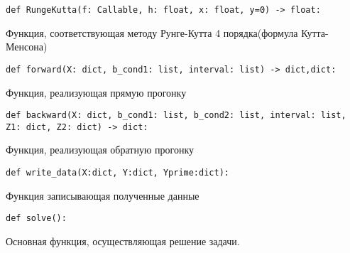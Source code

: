 \documentclass[11pt,a4paper]{report}
\begin{document}
\begin{lstlisting}
def RungeKutta(f: Callable, h: float, x: float, y=0) -> float:
\end{lstlisting}
Функция, соответствующая методу Рунге-Кутта 4 порядка(формула Кутта-Менсона)
\begin{lstlisting}
def forward(X: dict, b_cond1: list, interval: list) -> dict,dict:
\end{lstlisting}
Функция, реализующая прямую прогонку
\begin{lstlisting}
def backward(X: dict, b_cond1: list, b_cond2: list, interval: list, Z1: dict, Z2: dict) -> dict:
\end{lstlisting}
Функция, реализующая обратную прогонку
\begin{lstlisting}
def write_data(X:dict, Y:dict, Yprime:dict):
\end{lstlisting}
Функция записывающая полученные данные
\begin{lstlisting}
def solve():
\end{lstlisting}
Основная функция, осуществляющая решение задачи.
\end{document}

